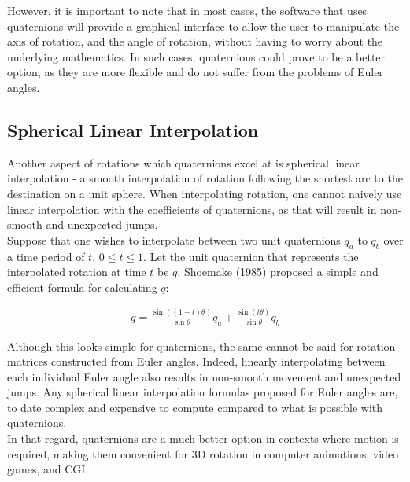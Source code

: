 \documentclass[12pt, a4paper]{article}
\begin{document}
However, it is important to note that in most cases, the software that uses
quaternions will provide a graphical interface to allow the user to manipulate
the axis of rotation, and the angle of rotation, without having to worry about
the underlying mathematics. In such cases, quaternions could prove to be a
better option, as they are more flexible and do not suffer from the problems of
Euler angles. \\

\pagebreak

\subsection{Spherical Linear Interpolation}
Another aspect of rotations which quaternions excel at is spherical linear
interpolation - a smooth interpolation of rotation following the shortest arc to
the destination on a unit sphere. When interpolating rotation, one cannot
naively use linear interpolation with the coefficients of quaternions, as that
will result in non-smooth and unexpected jumps. \\

Suppose that one wishes to interpolate between two unit quaternions $q_a$ to
$q_b$ over a time period of $t$, $0 \leq t \leq 1$. Let the unit quaternion that
represents the interpolated rotation at time $t$ be $q$. Shoemake (1985)
proposed a simple and efficient formula for calculating $q$:

\begin{align*}
    q = \frac{\sin((1 - t)\theta)}{\sin\theta}q_a + \frac{\sin(t\theta)}{\sin\theta}q_b
\end{align*}

Although this looks simple for quaternions, the same cannot be said for rotation
matrices constructed from Euler angles. Indeed, linearly interpolating between
each individual Euler angle also results in non-smooth movement and unexpected
jumps. Any spherical linear interpolation formulas proposed for Euler angles
are, to date complex and expensive to compute compared to what is possible with
quaternions. \\

In that regard, quaternions are a much better option in contexts where motion is
required, making them convenient for 3D rotation in computer animations, video
games, and CGI. \\

\end{document}
